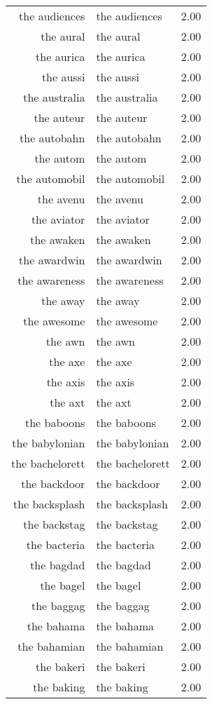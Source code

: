 \begin{table}[ht]
\begin{tabular}{rlr}
  the audiences & the audiences & 2.00 \\ 
  the aural & the aural & 2.00 \\ 
  the aurica & the aurica & 2.00 \\ 
  the aussi & the aussi & 2.00 \\ 
  the australia & the australia & 2.00 \\ 
  the auteur & the auteur & 2.00 \\ 
  the autobahn & the autobahn & 2.00 \\ 
  the autom & the autom & 2.00 \\ 
  the automobil & the automobil & 2.00 \\ 
  the avenu & the avenu & 2.00 \\ 
  the aviator & the aviator & 2.00 \\ 
  the awaken & the awaken & 2.00 \\ 
  the awardwin & the awardwin & 2.00 \\ 
  the awareness & the awareness & 2.00 \\ 
  the away & the away & 2.00 \\ 
  the awesome & the awesome & 2.00 \\ 
  the awn & the awn & 2.00 \\ 
  the axe & the axe & 2.00 \\ 
  the axis & the axis & 2.00 \\ 
  the axt & the axt & 2.00 \\ 
  the baboons & the baboons & 2.00 \\ 
  the babylonian & the babylonian & 2.00 \\ 
  the bachelorett & the bachelorett & 2.00 \\ 
  the backdoor & the backdoor & 2.00 \\ 
  the backsplash & the backsplash & 2.00 \\ 
  the backstag & the backstag & 2.00 \\ 
  the bacteria & the bacteria & 2.00 \\ 
  the bagdad & the bagdad & 2.00 \\ 
  the bagel & the bagel & 2.00 \\ 
  the baggag & the baggag & 2.00 \\ 
  the bahama & the bahama & 2.00 \\ 
  the bahamian & the bahamian & 2.00 \\ 
  the bakeri & the bakeri & 2.00 \\ 
  the baking & the baking & 2.00 \\ 

\end{tabular}
\end{table}
